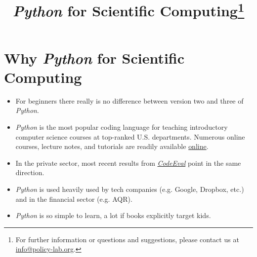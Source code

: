 \documentclass[a4paper,12pt,bold,leqno,fleqn,]{scrartcl}
\title{\textit{Python} for Scientific Computing\thanks{For further information or questions and suggestions, please contact us at \href{mailto: info@policy-lab.org}{info@policy-lab.org}.}}
\author{ }
\date{ }
\renewcommand{\baselinestretch}{1.3}\normalsize
\begin{document}
\maketitle


\vspace{0.5cm}
\renewcommand{\baselinestretch}{1.3}\normalsize 

\setcounter{page}{1}


\thispagestyle{empty}

\section{Why \textit{Python} for Scientific Computing}

\begin{itemize}
\item For beginners there really is no difference between version two and three of \textit{Python}.
\item \textit{Python} is the most popular coding language for teaching introductory computer science courses at top-ranked U.S. departments. Numerous online courses, lecture notes, and tutorials are readily available \href{http://www.fullstackpython.com/best-python-resources.html}{online}.
\item In the private sector, most recent results from \href{https://www.codeeval.com}{\textit{CodeEval}} point in the same direction.
\item \textit{Python} is used heavily used by tech companies (e.g. Google, Dropbox, etc.) and in the financial sector (e.g. AQR).
\item \textit{Python} is so simple to learn, a lot if books explicitly target kids. 
\end{itemize}


\end{document}
